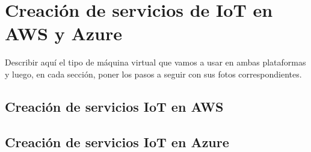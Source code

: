 \chapter{Creación de servicios de IoT en AWS y Azure}
Describir aquí el tipo de máquina virtual que vamos a usar en ambas plataformas y luego, en cada sección, poner los pasos a seguir con sus fotos correspondientes.
\section{Creación de servicios IoT en AWS}


\section{Creación de servicios IoT en Azure}